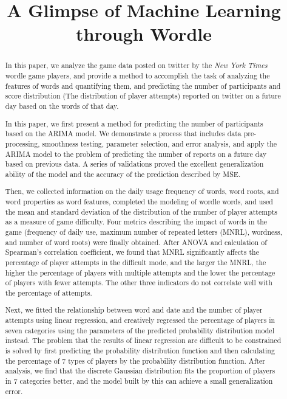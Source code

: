 \documentclass[12pt]{article}  %
\title{A Glimpse of Machine Learning through Wordle}  %
\begin{document}
\begin{abstract}
	In this paper, we analyze the game data posted on twitter by the \emph{New York Times} wordle game players, and provide a method to accomplish the task of analyzing the features of words and quantifying them, and predicting the number of participants and score distribution (The distribution of player attempts) reported on twitter on a future day based on the words of that day.

In this paper, we first present a method for predicting the number of participants based on the ARIMA model. We demonstrate a process that includes data pre-processing, smoothness testing, parameter selection, and error analysis, and apply the ARIMA model to the problem of predicting the number of reports on a future day based on previous data. A series of validations proved the excellent generalization ability of the model and the accuracy of the prediction described by MSE.

Then, we collected information on the daily usage frequency of words, word roots, and word properties as word features, completed the modeling of wordle words, and used the mean and standard deviation of the distribution of the number of player attempts as a measure of game difficulty. Four metrics describing the impact of words in the game (frequency of daily use, maximum number of repeated letters (MNRL), wordness, and number of word roots) were finally obtained. After ANOVA and calculation of Spearman's correlation coefficient, we found that MNRL significantly affects the percentage of player attempts in the difficult mode, and the larger the MNRL, the higher the percentage of players with multiple attempts and the lower the percentage of players with fewer attempts. The other three indicators do not correlate well with the percentage of attempts.

Next, we fitted the relationship between word and date and the number of player attempts using linear regression, and creatively regressed the percentage of players in seven categories using the parameters of the predicted probability distribution model instead. The problem that the results of linear regression are difficult to be constrained is solved by first predicting the probability distribution function and then calculating the percentage of 7 types of players by the probability distribution function. After analysis, we find that the discrete Gaussian distribution fits the proportion of players in 7 categories better, and the model built by this can achieve a small generalization error.


\end{abstract}
\end{document}
